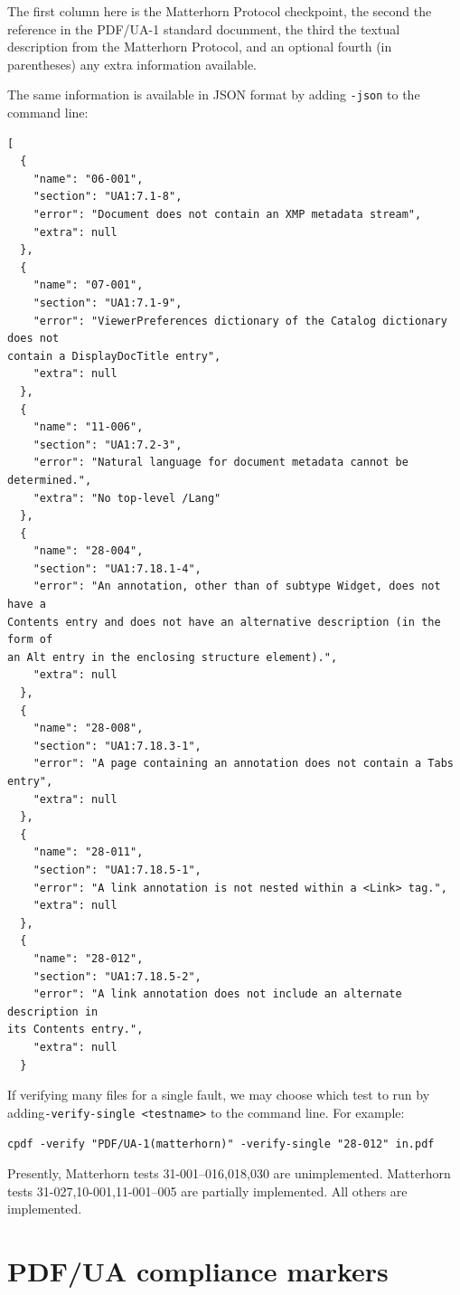 \documentclass{book}
\begin{document}
\noindent The first column here is the Matterhorn Protocol checkpoint, the second the reference in the PDF/UA-1 standard docunment, the third the textual description from the Matterhorn Protocol, and an optional fourth (in parentheses) any extra information available.

The same information is available in JSON format by adding \texttt{-json} to the command line:

{\small\begin{verbatim}
[
  {
    "name": "06-001",
    "section": "UA1:7.1-8",
    "error": "Document does not contain an XMP metadata stream",
    "extra": null
  },
  {
    "name": "07-001",
    "section": "UA1:7.1-9",
    "error": "ViewerPreferences dictionary of the Catalog dictionary does not
contain a DisplayDocTitle entry",
    "extra": null
  },
  {
    "name": "11-006",
    "section": "UA1:7.2-3",
    "error": "Natural language for document metadata cannot be determined.",
    "extra": "No top-level /Lang"
  },
  {
    "name": "28-004",
    "section": "UA1:7.18.1-4",
    "error": "An annotation, other than of subtype Widget, does not have a
Contents entry and does not have an alternative description (in the form of
an Alt entry in the enclosing structure element).",
    "extra": null
  },
  {
    "name": "28-008",
    "section": "UA1:7.18.3-1",
    "error": "A page containing an annotation does not contain a Tabs entry",
    "extra": null
  },
  {
    "name": "28-011",
    "section": "UA1:7.18.5-1",
    "error": "A link annotation is not nested within a <Link> tag.",
    "extra": null
  },
  {
    "name": "28-012",
    "section": "UA1:7.18.5-2",
    "error": "A link annotation does not include an alternate description in
its Contents entry.",
    "extra": null
  }\end{verbatim}}

\noindent If verifying many files for a single fault, we may choose which test to run by adding\linebreak \texttt{-verify-single <testname>} to the command line. For example:


  \begin{framed}
    \noindent\small\verb!cpdf -verify "PDF/UA-1(matterhorn)" -verify-single "28-012" in.pdf!
  \end{framed}

\noindent Presently, Matterhorn tests 31-001--016,018,030 are unimplemented. Matterhorn tests 31-027,10-001,11-001--005 are partially implemented. All others are implemented.

\section{PDF/UA compliance markers}
\end{document}
